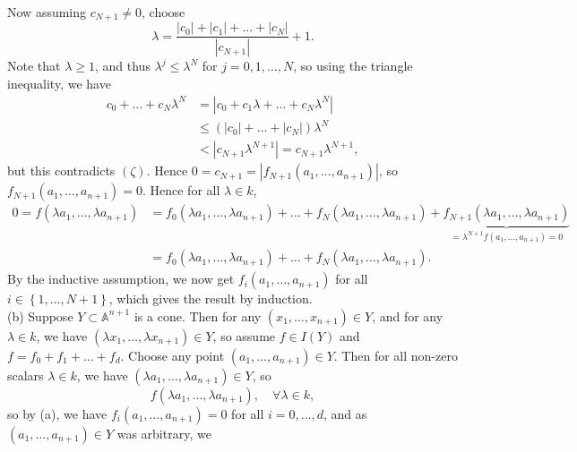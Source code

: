 \documentclass[a4paper]{article}
\begin{document}
    Now assuming $c_{N+1} \neq 0$, choose
    \[
        \lambda = \frac{\left| c_0 \right| + \left| c_1 \right| 
        + \ldots + \left| c_{N} \right| }{\left| c_{N+1} \right| } + 1.
    \] 
    Note that $\lambda \ge 1$, and thus $\lambda^{j} \le \lambda^{N}$ for
    $j = 0, 1, \ldots, N$, so using the triangle inequality, we have
    \begin{align*}
        c_0 + \ldots + c_N \lambda^{N}
        &= \left| c_0 + c_1 \lambda + \ldots + c_N \lambda^{N} \right|\\
        &\le  \left( \left| c_0 \right| + \ldots + \left| c_N \right|  \right) 
        \lambda^{N}\\
        &< \left| c_{N+1} \lambda^{N+1} \right| 
        = c_{N+1} \lambda^{N+1},
    \end{align*}
    but this contradicts $(\zeta)$. Hence
    $0 = c_{N+1} = \left| f_{N+1}(a_1, \ldots, a_{n+1}) \right| $, so
    $f_{N+1} \left( a_1, \ldots, a_{n+1} \right) = 0$. Hence
    for all $\lambda \in k$,
    \begin{align*}
    0 = f\left( \lambda a_1 ,\ldots, \lambda a_{n+1} \right) 
    &= f_0 \left( \lambda a_1, \ldots, \lambda a_{n+1} \right) 
    + \ldots + f_N \left( \lambda a_1, \ldots, \lambda a_{n+1} \right) 
    + \underbrace{f_{N+1} \left( \lambda a_1 , \ldots , \lambda a_{n+1}
    \right)}_{= \lambda^{N+1} f\left( a_1, \ldots, a_{n+1} \right) =0}\\
    &= f_0 \left( \lambda a_1, \ldots, \lambda a_{n+1} \right) 
    + \ldots + f_N \left( \lambda a_1, \ldots, \lambda a_{n+1} \right).
    \end{align*}
    By the inductive assumption, we now get
    $f_i \left( a_1, \ldots, a_{n+1} \right) $ for all $i \in \left\{ 1,\ldots,
    N+1\right\} $, which gives the result by induction.\\
    \linebreak
    (b)  Suppose $Y \subset \mathbb{A}^{n+1}$ is a cone. Then
    for any $(x_1, \ldots, x_{n+1}) \in Y$, and for any $\lambda \in k$, we
    have
    $\left( \lambda x_1, \ldots, \lambda x_{n+1} \right) \in Y$, so
    assume $f \in I(Y)$ and $f = f_0 + f_1 + \ldots + f_d$. Choose
    any point $(a_1, \ldots, a_{n+1}) \in Y$. Then
    for all non-zero scalars $\lambda \in k$, we have
    $(\lambda a_1, \ldots, \lambda a_{n+1}) \in Y$, so
    \[
    f\left( \lambda a_1, \ldots, \lambda a_{n+1} \right), \quad \forall \lambda
    \in k,
    \] 
    so by (a), we have $f_i \left( a_1 , \ldots, a_{n+1} \right) = 0$ for all
    $i = 0,\ldots, d$, and as $(a_1, \ldots, a_{n+1}) \in Y$  was arbitrary, we
\end{document}
